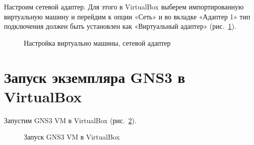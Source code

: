 \documentclass[
  english,
  russian,
  12pt,
  a4paper,
  DIV=11,
  numbers=noendperiod]{scrreprt}
\begin{document}
Настроим сетевой адаптер. Для этого в VirtualBox выберем импортированную
виртуальную машину и перейдим к опции «Сеть» и во вкладке «Адаптер 1»
тип подключения должен быть установлен как «Виртуальный адаптер»
(рис.~\ref{fig-009}).

\begin{figure}


\caption{\label{fig-009}Настройка виртуально машины, сетевой адаптер}

\end{figure}%

\section{Запуск экземпляра GNS3 в
VirtualBox}\label{ux437ux430ux43fux443ux441ux43a-ux44dux43aux437ux435ux43cux43fux43bux44fux440ux430-gns3-ux432-virtualbox}

Запустим GNS3 VM в VirtualBox (рис.~\ref{fig-010}).

\begin{figure}


\caption{\label{fig-010}Запуск GNS3 VM в VirtualBox}

\end{figure}%
\end{document}
